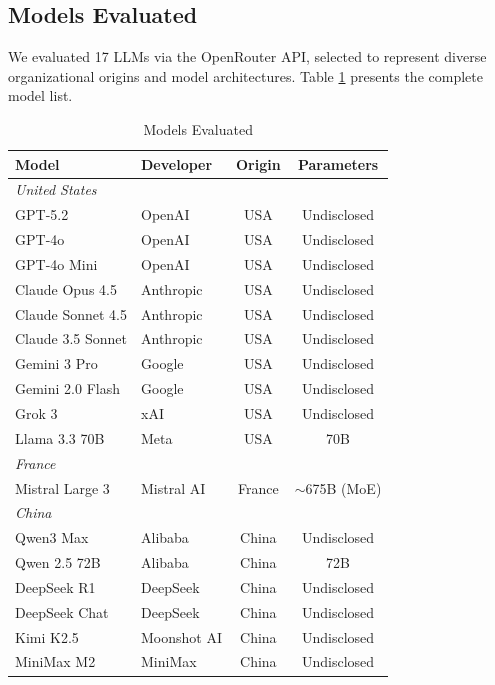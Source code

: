 \documentclass[11pt,a4paper]{article}
\begin{document}
\subsection{Models Evaluated}

We evaluated 17 LLMs via the OpenRouter API, selected to represent diverse organizational origins and model architectures. Table \ref{tab:models} presents the complete model list.

\begin{table}[H]
\centering
\caption{Models Evaluated}
\begin{tabular}{llcc}
\toprule
\textbf{Model} & \textbf{Developer} & \textbf{Origin} & \textbf{Parameters} \\
\midrule
\multicolumn{4}{l}{\textit{United States}} \\
GPT-5.2 & OpenAI & USA & Undisclosed \\
GPT-4o & OpenAI & USA & Undisclosed \\
GPT-4o Mini & OpenAI & USA & Undisclosed \\
Claude Opus 4.5 & Anthropic & USA & Undisclosed \\
Claude Sonnet 4.5 & Anthropic & USA & Undisclosed \\
Claude 3.5 Sonnet & Anthropic & USA & Undisclosed \\
Gemini 3 Pro & Google & USA & Undisclosed \\
Gemini 2.0 Flash & Google & USA & Undisclosed \\
Grok 3 & xAI & USA & Undisclosed \\
Llama 3.3 70B & Meta & USA & 70B \\
\multicolumn{4}{l}{\textit{France}} \\
Mistral Large 3 & Mistral AI & France & $\sim$675B (MoE) \\
\multicolumn{4}{l}{\textit{China}} \\
Qwen3 Max & Alibaba & China & Undisclosed \\
Qwen 2.5 72B & Alibaba & China & 72B \\
DeepSeek R1 & DeepSeek & China & Undisclosed \\
DeepSeek Chat & DeepSeek & China & Undisclosed \\
Kimi K2.5 & Moonshot AI & China & Undisclosed \\
MiniMax M2 & MiniMax & China & Undisclosed \\
\bottomrule
\end{tabular}
\label{tab:models}
\end{table}
\end{document}
